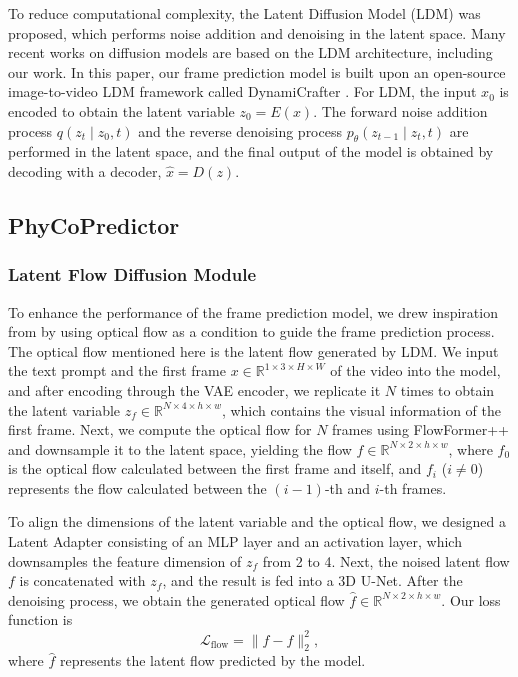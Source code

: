 To reduce computational complexity, the Latent Diffusion Model (LDM) \cite{LDM} was proposed, which performs noise addition and denoising in the latent space. Many recent works on diffusion models are based on the LDM architecture, including our work. In this paper, our frame prediction model is built upon an open-source image-to-video LDM framework called DynamiCrafter \cite{dynamicrafter}.  For LDM, the input \( x_0 \) is encoded to obtain the latent variable \( z_0 = E(x) \). The forward noise addition process \( q(z_t \mid z_0, t) \) and the reverse denoising process \( p_\theta(z_{t-1} \mid z_t, t) \) are performed in the latent space, and the final output of the model is obtained by decoding with a decoder, \( \hat{x} = D(z) \).

\subsection{PhyCoPredictor}


\subsubsection{Latent Flow Diffusion Module}

To enhance the performance of the frame prediction model, we drew inspiration from 
 \cite{lfdm} by using optical flow as a condition to guide the frame prediction process. The optical flow mentioned here is the latent flow generated by LDM. We input the text prompt and the first frame \( x \in \mathbb{R}^{1 \times 3 \times H \times W} \) of the video into the model, and after encoding through the VAE encoder, we replicate it \( N \) times to obtain the latent variable \( z_f \in \mathbb{R}^{N \times 4 \times h \times w} \), which contains the visual information of the first frame. Next, we compute the optical flow for \( N \) frames using FlowFormer++ and downsample it to the latent space, yielding the flow \( f \in \mathbb{R}^{N \times 2 \times h \times w} \), where \( f_0 \) is the optical flow calculated between the first frame and itself, and \( f_i \) (\( i \neq 0 \)) represents the flow calculated between the \((i - 1)\)-th and \( i \)-th frames.

To align the dimensions of the latent variable and the optical flow, we designed a Latent Adapter consisting of an MLP layer and an activation layer, which downsamples the feature dimension of \( z_f \) from 2 to 4. Next, the noised latent flow \( f \) is concatenated with \( z_f \), and the result is fed into a 3D U-Net. After the denoising process, we obtain the generated optical flow \( \hat{f} \in \mathbb{R}^{N \times 2 \times h \times w} \). Our loss function is 
\begin{equation}
\mathcal{L}_\text{flow} = \| f - \hat{f} \|_2^2,
\end{equation}
where \( \hat{f} \) represents the latent flow predicted by the model.


